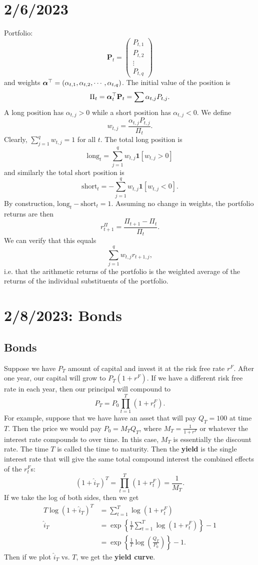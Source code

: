\documentclass[12pt]{report}
\begin{document}
\chapter{2/6/2023}
Portfolio: $$ \mathbf P_t=\begin{pmatrix} P_{t,1} \\ P_{t,2} \\ \vdots \\ P_{t,q} \end{pmatrix} $$ and weights $\boldsymbol{\alpha}^\top=(\alpha_{t,1},\alpha_{t,2},\cdots,\alpha_{t,q})$. The initial value of the position is $$ \Pi_t=\boldsymbol{\alpha}_t^\top \mathbf P_t=\sum \alpha_{t,j}P_{t,j}. $$ A long position has $\alpha_{t,j}>0$ while a short position has $\alpha_{t,j}<0$. We define $$ w_{t,j}=\frac{\alpha_{t,j}P_{t,j}}{\Pi_t}. $$ Clearly, $\sum_{j=1}^q w_{t,j}=1$ for all $t$. The total long position is $$ \text{long}_t = \sum_{j=1}^q w_{t,j}\mathbf 1[w_{t,j}>0] $$ and similarly the total short position is $$ \text{short}_t = -\sum_{j=1}^q w_{t,j}\mathbf 1[w_{t,j}<0]. $$ By construction, $\text{long}_t-\text{short}_t=1$. Assuming no change in weights, the portfolio returns are then $$ r_{t+1}^\Pi=\frac{\Pi_{t+1}-\Pi_t}{\Pi_t}. $$ We can verify that this equals $$ \sum_{j=1}^q w_{t,j} r_{t+1,j}, $$ i.e. that the arithmetic returns of the portfolio is the weighted average of the returns of the individual substituents of the portfolio.

\chapter{2/8/2023: Bonds}
\section{Bonds}
Suppose we have $P_T$ amount of capital and invest it at the risk free rate $r^F$. After one year, our capital will grow to $P_T(1+r^F)$. If we have a different risk free rate in each year, then our principal will compound to $$ P_T = P_0\prod_{t=1}^T(1+r_t^F). $$ For example, suppose that we have have an asset that will pay $Q_T=100$ at time $T$. Then the price we would pay $P_0=M_TQ_T$, where $M_T=\frac{1}{1+r^F}$ or whatever the interest rate compounds to over time. In this case, $M_T$ is essentially the discount rate. The time $T$ is called the time to maturity. Then the \textbf{yield} is the single interest rate that will give the same total compound interest the combined effects of the $r_t^F$s: $$ (1+\hat i_T)^T = \prod_{t=1}^T(1+r_t^F) = \frac{1}{M_T}. $$ If we take the log of both sides, then we get \begin{align*}
	T\log(1+\hat i_T)^T &= \sum_{t=1}^T\log(1+r_t^F) \\
	\hat i_T &= \exp\left\{\frac{1}{T}\sum_{t=1}^T\log(1+r_t^F)\right\} - 1 \\
		&= \exp\left\{\frac{1}{T}\log\left(\frac{Q_T}{P_0}\right)\right\}-1.
\end{align*} Then if we plot $\hat i_T$ vs. $T$, we get the \textbf{yield curve}.
\end{document}

